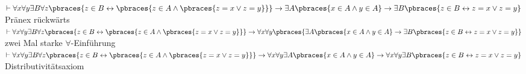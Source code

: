 \begin{solution}
\begin{algorithmic}[1]
	\State $\vdash \forall x \forall y \exists B \forall z \pbraces{z \in B \leftrightarrow \pbraces{ z \in A \land \pbraces{z = x \lor z = y}}} \rightarrow \exists A \pbraces{x \in A \land y \in A} \rightarrow \exists B \pbraces{z \in B \leftrightarrow z = x \lor z=y}$ \Comment Pränex rückwärts
	\State $\vdash \forall x \forall y \exists B \forall z \pbraces{z \in B \leftrightarrow \pbraces{ z \in A \land \pbraces{z = x \lor z = y}}} \rightarrow \forall x \forall y\pbraces{\exists A \pbraces{x \in A \land y \in A} \rightarrow \exists B \pbraces{z \in B \leftrightarrow z = x \lor z=y}}$ \Comment zwei Mal starke $\forall$-Einführung
	\State $\vdash \forall x \forall y \exists B \forall z \pbraces{z \in B \leftrightarrow \pbraces{ z \in A \land \pbraces{z = x \lor z = y}}} \rightarrow \forall x \forall y \exists A \pbraces{x \in A \land y \in A} \rightarrow \forall x \forall y \exists B \pbraces{z \in B \leftrightarrow z = x \lor z=y}$ \Comment Distributivitätsaxiom
\end{algorithmic}

\end{solution}
